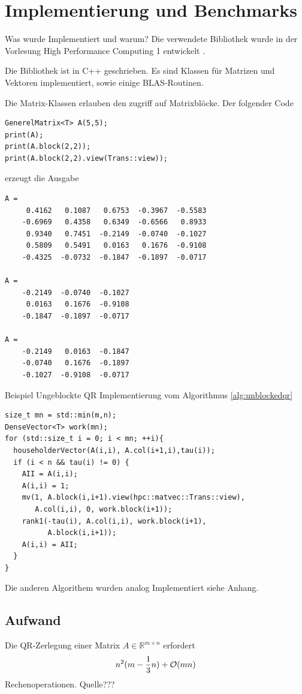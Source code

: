 \chapter{Implementierung und Benchmarks}
Was wurde Implementiert und warum?
Die verwendete Bibliothek wurde in der Vorlesung High Performance Computing 1 entwickelt \cite{HPC1}.

Die Bibliothek ist in C++ geschrieben. Es sind Klassen für Matrizen und Vektoren implementiert, sowie einige BLAS-Routinen.

Die Matrix-Klassen erlauben den zugriff auf Matrixblöcke. 
Der folgender Code
\begin{lstlisting}
GenerelMatrix<T> A(5,5);
print(A);
print(A.block(2,2));
print(A.block(2,2).view(Trans::view));
\end{lstlisting}
erzeugt die Ausgabe
\begin{lstlisting} 
A = 
     0.4162   0.1087   0.6753  -0.3967  -0.5583
    -0.6969   0.4358   0.6349  -0.6566   0.8933
     0.9340   0.7451  -0.2149  -0.0740  -0.1027
     0.5809   0.5491   0.0163   0.1676  -0.9108
    -0.4325  -0.0732  -0.1847  -0.1897  -0.0717

A = 
    -0.2149  -0.0740  -0.1027
     0.0163   0.1676  -0.9108
    -0.1847  -0.1897  -0.0717

A = 
    -0.2149   0.0163  -0.1847
    -0.0740   0.1676  -0.1897
    -0.1027  -0.9108  -0.0717
\end{lstlisting}



Beispiel Ungeblockte QR Implementierung vom Algorithmus \ref{alg:unblockedqr}
\begin{lstlisting}
size_t mn = std::min(m,n);
DenseVector<T> work(mn);
for (std::size_t i = 0; i < mn; ++i){
  householderVector(A(i,i), A.col(i+1,i),tau(i));
  if (i < n && tau(i) != 0) {
    AII = A(i,i);
    A(i,i) = 1;
    mv(1, A.block(i,i+1).view(hpc::matvec::Trans::view),
       A.col(i,i), 0, work.block(i+1));
    rank1(-tau(i), A.col(i,i), work.block(i+1), 
          A.block(i,i+1));
    A(i,i) = AII;
  }
}
\end{lstlisting}

Die anderen Algorithem wurden analog Implementiert siehe Anhang.


\section{Aufwand}

Die QR-Zerlegung einer Matrix $A \in \mathbb{R}^{m \times n}$  erfordert
\begin{align*}
	n^2(m-\frac{1}{3} n) + {\cal O}(mn)
\end{align*}
Rechenoperationen. Quelle???

